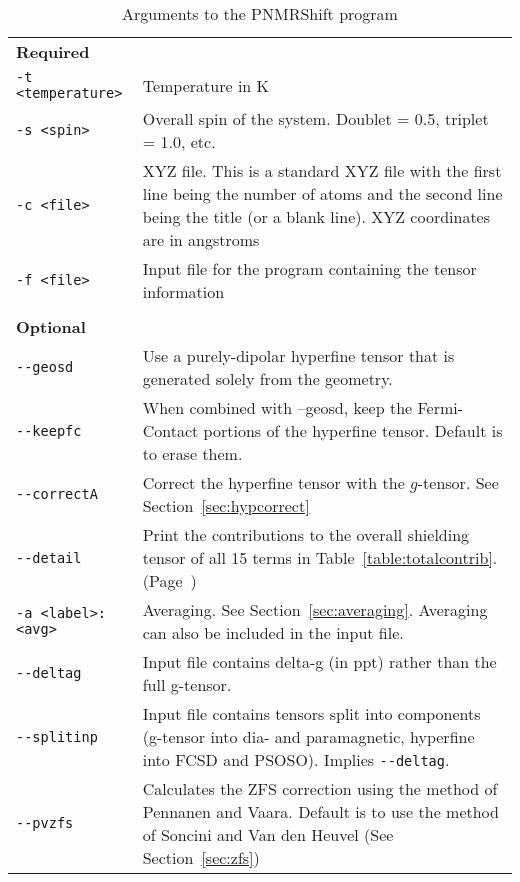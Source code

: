 \documentclass[11pt]{report}
\newcommand\PNMRShift{\textsf{PNMRShift}\xspace}
\newcommand{\code}[1]{\lstinline!#1!}
\begin{document}
\begin{table}
\centering
\caption{Arguments to the \PNMRShift program}
\label{table:cmdline}
\begin{tabular}{lp{3in}}
\hline
\textbf{Required}       & \\
\code{-t <temperature>} & Temperature in K \\
\code{-s <spin>}        & Overall spin of the system. Doublet = 0.5, triplet = 1.0, etc. \\ 
\code{-c <file>}        & XYZ file. This is a standard XYZ file with the first line being
                          the number of atoms and the second line being the title (or a
                          blank line). XYZ coordinates are in angstroms \\
\code{-f <file>}        & Input file for the program containing the tensor information \\
\\
\textbf{Optional}       & \\
\code{--geosd}          & Use a purely-dipolar hyperfine tensor that is generated solely from the geometry. \\
\code{--keepfc}         & When combined with --geosd, keep the Fermi-Contact portions of the hyperfine tensor. Default is to erase them.\\
\code{--correctA}       & Correct the hyperfine tensor with the $g$-tensor. See Section~\ref{sec:hypcorrect} \\
\code{--detail}         & Print the contributions to the overall shielding tensor of all 15 terms in Table~\ref{table:totalcontrib}. (Page~\pageref{table:totalcontrib})\\ 
\code{-a <label>:<avg>} & Averaging. See Section~\ref{sec:averaging}. Averaging can also be included in the input file.\\
\code{--deltag}         & Input file contains delta-g (in ppt) rather than the full g-tensor.\\
\code{--splitinp}       & Input file contains tensors split into components (g-tensor into dia- and paramagnetic, hyperfine into FCSD and PSOSO). Implies \code{--deltag}.\\
\code{--pvzfs}          & Calculates the ZFS correction using the method of Pennanen and Vaara. Default is to use the method of Soncini and Van den Heuvel (See Section~\ref{sec:zfs})\\
\hline
\end{tabular}
\end{table}
\end{document}

